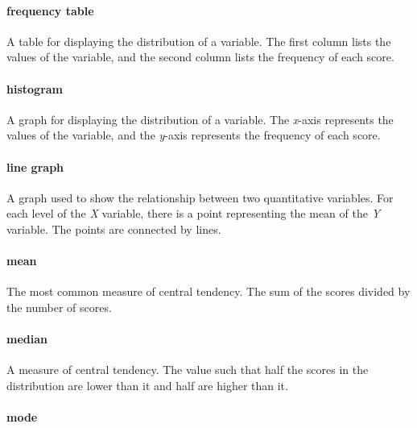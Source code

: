 \documentclass[
]{krantz}
\begin{document}
\hypertarget{frequency-table}{%
\paragraph*{frequency table}\label{frequency-table}}

A table for displaying the distribution of a variable. The first column lists the values of the variable, and the second column lists the frequency of each score.

\hypertarget{histogram}{%
\paragraph*{histogram}\label{histogram}}

A graph for displaying the distribution of a variable. The \emph{x}-axis represents the values of the variable, and the \emph{y}-axis represents the frequency of each score.

\hypertarget{line-graph}{%
\paragraph*{line graph}\label{line-graph}}

A graph used to show the relationship between two quantitative variables. For each level of the \emph{X} variable, there is a point representing the mean of the \emph{Y} variable. The points are connected by lines.

\hypertarget{mean}{%
\paragraph*{mean}\label{mean}}

The most common measure of central tendency. The sum of the scores divided by the number of scores.

\hypertarget{median}{%
\paragraph*{median}\label{median}}

A measure of central tendency. The value such that half the scores in the distribution are lower than it and half are higher than it.

\hypertarget{mode}{%
\paragraph*{mode}\label{mode}}
\end{document}
